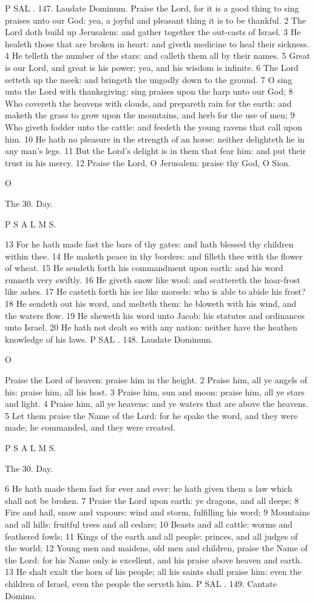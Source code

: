 P SAL . 147. Laudate Dominum. Praise the Lord, for it is a good thing to sing praises unto our God: yea, a joyful and pleasant thing it is to be thankful. 2 The Lord doth build up Jerusalem: and gather together the out-casts of Israel. 3 He healeth those that are broken in heart: and giveth medicine to heal their sickness. 4 He telleth the number of the stars: and calleth them all by their names. 5 Great is our Lord, and great is his power: yea, and his wisdom is infinite. 6 The Lord setteth up the meek: and bringeth the ungodly down to the ground. 7 O sing unto the Lord with thanksgiving: sing praises upon the harp unto our God; 8 Who covereth the heavens with clouds, and prepareth rain for the earth: and maketh the grass to grow upon the mountains, and herb for the use of men; 9 Who giveth fodder unto the cattle: and feedeth the young ravens that call upon him. 10 He hath no pleasure in the strength of an horse: neither delighteth he in any man’s legs. 11 But the Lord’s delight is in them that fear him: and put their trust in his mercy. 12 Praise the Lord, O Jerusalem: praise thy God, O Sion.

O

The 30. Day.

P S A L M S.

13 For he hath made fast the bars of thy gates: and hath blessed thy children within thee. 14 He maketh peace in thy borders: and filleth thee with the flower of wheat. 15 He sendeth forth his commandment upon earth: and his word runneth very swiftly. 16 He giveth snow like wool: and scattereth the hoar-frost like ashes. 17 He casteth forth his ice like morsels: who is able to abide his frost? 18 He sendeth out his word, and melteth them: he bloweth with his wind, and the waters flow. 19 He sheweth his word unto Jacob: his statutes and ordinances unto Israel. 20 He hath not dealt so with any nation: neither have the heathen knowledge of his laws. P SAL . 148. Laudate Dominum.

O

Praise the Lord of heaven: praise him in the height. 2 Praise him, all ye angels of his: praise him, all his host. 3 Praise him, sun and moon: praise him, all ye stars and light. 4 Praise him, all ye heavens: and ye waters that are above the heavens. 5 Let them praise the Name of the Lord: for he spake the word, and they were made; he commanded, and they were created.

P S A L M S.

The 30. Day.

6 He hath made them fast for ever and ever: he hath given them a law which shall not be broken. 7 Praise the Lord upon earth: ye dragons, and all deeps; 8 Fire and hail, snow and vapours: wind and storm, fulfilling his word; 9 Mountains and all hills: fruitful trees and all cedars; 10 Beasts and all cattle: worms and feathered fowls; 11 Kings of the earth and all people: princes, and all judges of the world; 12 Young men and maidens, old men and children, praise the Name of the Lord: for his Name only is excellent, and his praise above heaven and earth. 13 He shalt exalt the horn of his people; all his saints shall praise him: even the children of Israel, even the people the serveth him. P SAL . 149. Cantate Domino.

